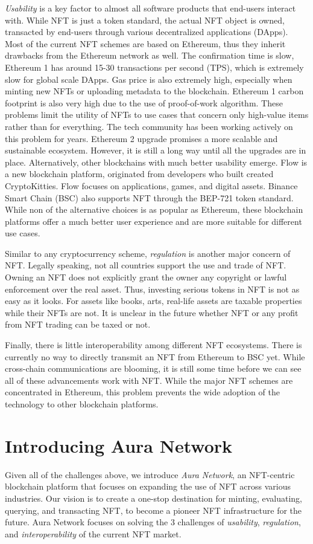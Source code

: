 \documentclass[12pt]{article}
\begin{document}
\emph{Usability} is a key factor to almost all software products that end-users interact with. While NFT is just a token standard, the actual NFT object is owned, transacted by end-users through various decentralized applications (DApps). Most of the current NFT schemes are based on Ethereum, thus they inherit drawbacks from the Ethereum network as well. The confirmation time is slow, Ethereum 1 has around 15-30 transactions per second (TPS), which is extremely slow for global scale DApps. Gas price is also extremely high, especially when minting new NFTs or uploading metadata to the blockchain. Ethereum 1 carbon footprint is also very high due to the use of proof-of-work algorithm. These problems limit the utility of NFTs to use cases that concern only high-value items rather than for everything. The tech community has been working actively on this problem for years. Ethereum 2 upgrade promises a more scalable and sustainable ecosystem. However, it is still a long way until all the upgrades are in place. Alternatively, other blockchains with much better usability emerge. Flow is a new blockchain platform, originated from developers who built created CryptoKitties. Flow focuses on applications, games, and digital assets. Binance Smart Chain (BSC) also supports NFT through the BEP-721 token standard. While non of the alternative choices is as popular as Ethereum, these blockchain platforms offer a much better user experience and are more suitable for different use cases. 

Similar to any cryptocurrency scheme, \emph{regulation} is another major concern of NFT. Legally speaking, not all countries support the use and trade of NFT. Owning an NFT does not explicitly grant the owner any copyright or lawful enforcement over the real asset. Thus, investing serious tokens in NFT is not as easy as it looks. For assets like books, arts, real-life assets are taxable properties while their NFTs are not. It is unclear in the future whether NFT or any profit from NFT trading can be taxed or not.

Finally, there is little interoperability among different NFT ecosystems. There is currently no way to directly transmit an NFT from Ethereum to BSC yet. While cross-chain communications are blooming, it is still some time before we can see all of these advancements work with NFT. While the major NFT schemes are concentrated in Ethereum, this problem prevents the wide adoption of the technology to other blockchain platforms.

\section{Introducing Aura Network}
Given all of the challenges above, we introduce \emph{Aura Network}, an NFT-centric blockchain platform that focuses on expanding the use of NFT across various industries. Our vision is to create a one-stop destination for minting, evaluating, querying, and transacting NFT, to become a pioneer NFT infrastructure for the future. Aura Network focuses on solving the 3 challenges of \emph{usability}, \emph{regulation}, and \emph{interoperability} of the current NFT market.
\end{document}
